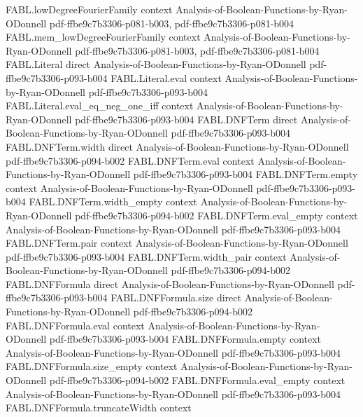 \begin{theorem}
\proofstep
  {FABL.lowDegreeFourierFamily}
  {context}
  {Analysis-of-Boolean-Functions-by-Ryan-ODonnell}
  {pdf-ffbe9c7b3306-p081-b003,
    pdf-ffbe9c7b3306-p081-b004}
\proofstep
  {FABL.mem_lowDegreeFourierFamily}
  {context}
  {Analysis-of-Boolean-Functions-by-Ryan-ODonnell}
  {pdf-ffbe9c7b3306-p081-b003,
    pdf-ffbe9c7b3306-p081-b004}
\proofstep
  {FABL.Literal}
  {direct}
  {Analysis-of-Boolean-Functions-by-Ryan-ODonnell}
  {pdf-ffbe9c7b3306-p093-b004}
\proofstep
  {FABL.Literal.eval}
  {context}
  {Analysis-of-Boolean-Functions-by-Ryan-ODonnell}
  {pdf-ffbe9c7b3306-p093-b004}
\proofstep
  {FABL.Literal.eval_eq_neg_one_iff}
  {context}
  {Analysis-of-Boolean-Functions-by-Ryan-ODonnell}
  {pdf-ffbe9c7b3306-p093-b004}
\proofstep
  {FABL.DNFTerm}
  {direct}
  {Analysis-of-Boolean-Functions-by-Ryan-ODonnell}
  {pdf-ffbe9c7b3306-p093-b004}
\proofstep
  {FABL.DNFTerm.width}
  {direct}
  {Analysis-of-Boolean-Functions-by-Ryan-ODonnell}
  {pdf-ffbe9c7b3306-p094-b002}
\proofstep
  {FABL.DNFTerm.eval}
  {context}
  {Analysis-of-Boolean-Functions-by-Ryan-ODonnell}
  {pdf-ffbe9c7b3306-p093-b004}
\proofstep
  {FABL.DNFTerm.empty}
  {context}
  {Analysis-of-Boolean-Functions-by-Ryan-ODonnell}
  {pdf-ffbe9c7b3306-p093-b004}
\proofstep
  {FABL.DNFTerm.width_empty}
  {context}
  {Analysis-of-Boolean-Functions-by-Ryan-ODonnell}
  {pdf-ffbe9c7b3306-p094-b002}
\proofstep
  {FABL.DNFTerm.eval_empty}
  {context}
  {Analysis-of-Boolean-Functions-by-Ryan-ODonnell}
  {pdf-ffbe9c7b3306-p093-b004}
\proofstep
  {FABL.DNFTerm.pair}
  {context}
  {Analysis-of-Boolean-Functions-by-Ryan-ODonnell}
  {pdf-ffbe9c7b3306-p093-b004}
\proofstep
  {FABL.DNFTerm.width_pair}
  {context}
  {Analysis-of-Boolean-Functions-by-Ryan-ODonnell}
  {pdf-ffbe9c7b3306-p094-b002}
\proofstep
  {FABL.DNFFormula}
  {direct}
  {Analysis-of-Boolean-Functions-by-Ryan-ODonnell}
  {pdf-ffbe9c7b3306-p093-b004}
\proofstep
  {FABL.DNFFormula.size}
  {direct}
  {Analysis-of-Boolean-Functions-by-Ryan-ODonnell}
  {pdf-ffbe9c7b3306-p094-b002}
\proofstep
  {FABL.DNFFormula.eval}
  {context}
  {Analysis-of-Boolean-Functions-by-Ryan-ODonnell}
  {pdf-ffbe9c7b3306-p093-b004}
\proofstep
  {FABL.DNFFormula.empty}
  {context}
  {Analysis-of-Boolean-Functions-by-Ryan-ODonnell}
  {pdf-ffbe9c7b3306-p093-b004}
\proofstep
  {FABL.DNFFormula.size_empty}
  {context}
  {Analysis-of-Boolean-Functions-by-Ryan-ODonnell}
  {pdf-ffbe9c7b3306-p094-b002}
\proofstep
  {FABL.DNFFormula.eval_empty}
  {context}
  {Analysis-of-Boolean-Functions-by-Ryan-ODonnell}
  {pdf-ffbe9c7b3306-p093-b004}
\proofstep
  {FABL.DNFFormula.truncateWidth}
  {context}

\end{theorem}
